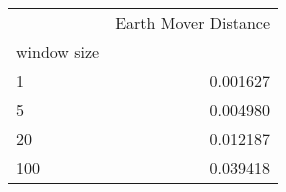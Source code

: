 \begin{tabular}{lr}
\toprule
{} &  Earth Mover Distance \\
window size &                       \\
\midrule
1           &              0.001627 \\
5           &              0.004980 \\
20          &              0.012187 \\
100         &              0.039418 \\
\bottomrule
\end{tabular}
